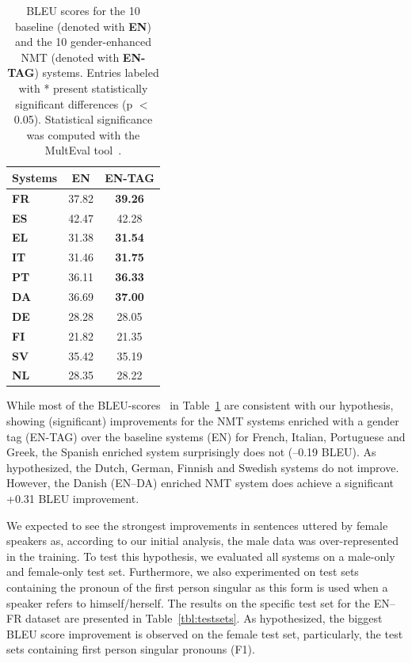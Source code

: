 \begin{table}[h!]
\centering
\footnotesize\begin{tabular}{|l|c|c|}
\hline
\bf{Systems}	&	\bf{EN}		&	\bf{EN-TAG}	            \\	\hline
\bf{FR} 		&	37.82	    &   \bf{39.26\rlap{*}}      \\	\hline
\bf{ES}	    	&	42.47		&	42.28 	 	            \\	\hline
\bf{EL}		    &	31.38		&	\bf{31.54}	 	        \\	\hline
\bf{IT}		    &	31.46		&	\bf{31.75\rlap{*}}	 	\\	\hline
\bf{PT}		    &	36.11		&	\bf{36.33}	 	        \\	\hline\hline
\bf{DA}		    &	36.69		&	\bf{37.00\rlap{*}}      \\	\hline
\bf{DE}		    &	28.28		&	28.05 	 	            \\	\hline
\bf{FI}	    	&	21.82		&	21.35\rlap{*}	 	    \\	\hline
\bf{SV}		    &	35.42		&	35.19 	 	            \\	\hline
\bf{NL}	    	&	28.35		&	28.22                   \\	\hline
\end{tabular}
 
 \caption{BLEU scores for the 10 baseline (denoted with \textbf{EN}) and the 10 gender-enhanced NMT (denoted with \textbf{EN-TAG}) systems. Entries labeled with * present statistically significant differences (p $<$ 0.05). Statistical significance was computed with the MultEval tool~\cite{Clark2011}. }\label{tbl:BLEU}
\end{table}

While most of the BLEU-scores~\cite{Papineni2002} in Table~\ref{tbl:BLEU} are consistent with our hypothesis, showing (significant) improvements for the NMT systems enriched with a gender tag (EN-TAG) over the baseline systems (EN) for French, Italian, Portuguese and Greek, the Spanish enriched system surprisingly does not (--0.19 BLEU). As hypothesized, the Dutch, German, Finnish and Swedish systems do not improve. However, the Danish (EN--DA) enriched NMT system does achieve a significant +0.31 BLEU improvement. 

We expected to see the strongest improvements in sentences uttered by female speakers as, according to our initial analysis, the male data was over-represented in the training. To test this hypothesis, we evaluated all systems on a male-only and female-only test set. Furthermore, we also experimented on test sets containing the pronoun of the first person singular as this form is used when a speaker refers to himself/herself. The results on the specific test set for the EN--FR dataset are presented in Table~\ref{tbl:testsets}. As hypothesized, the biggest BLEU score improvement is observed on the female test set, particularly, the test sets containing first person singular pronouns (F1).

